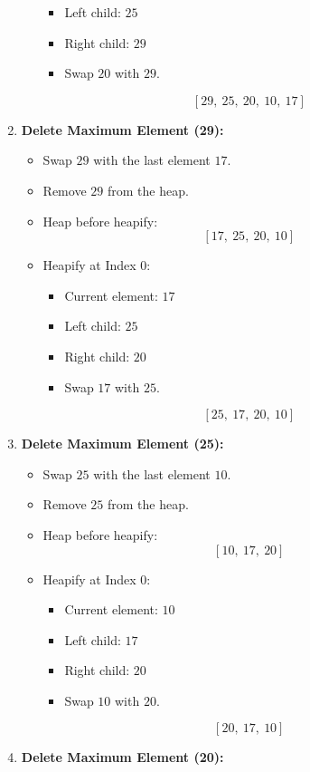 \documentclass{cs1204}
\begin{document}
\begin{enumerate}[label=\textbf{\arabic*.}]
\begin{itemize}
\begin{itemize}
            \item Left child: \(25\)
            \item Right child: \(29\)
            \item Swap \(20\) with \(29\).
        \end{itemize}
        \[
        [29, \ 25, \ 20, \ 10, \ 17]
        \]
    \end{itemize}
    \item \textbf{Delete Maximum Element (29):}
    \begin{itemize}
        \item Swap \(29\) with the last element \(17\).
        \item Remove \(29\) from the heap.
        \item Heap before heapify:
        \[
        [17, \ 25, \ 20, \ 10]
        \]
        \item Heapify at Index 0:
        \begin{itemize}
            \item Current element: \(17\)
            \item Left child: \(25\)
            \item Right child: \(20\)
            \item Swap \(17\) with \(25\).
        \end{itemize}
        \[
        [25, \ 17, \ 20, \ 10]
        \]
    \end{itemize}
    \item \textbf{Delete Maximum Element (25):}
    \begin{itemize}
        \item Swap \(25\) with the last element \(10\).
        \item Remove \(25\) from the heap.
        \item Heap before heapify:
        \[
        [10, \ 17, \ 20]
        \]
        \item Heapify at Index 0:
        \begin{itemize}
            \item Current element: \(10\)
            \item Left child: \(17\)
            \item Right child: \(20\)
            \item Swap \(10\) with \(20\).
        \end{itemize}
        \[
        [20, \ 17, \ 10]
        \]
    \end{itemize}
    \item \textbf{Delete Maximum Element (20):}

\end{enumerate}
\end{document}
